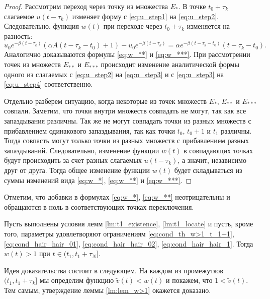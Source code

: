 \begin{proof}
	
	Рассмотрим переход через точку из множества $E_*$. В точке $t_0 + \tau_k$ слагаемое $u(t - \tau_k)$ изменяет форму с \eqref{eq:u_step1} %
	на \eqref{eq:u_step2}. %
	Следовательно, функция $w(t)$ при переходе через $t_0 + \tau_k$ изменяется на разность:
	\[u_0 e^{-\beta( t-\tau_k)}(\alpha A(t - \tau_k - t_0)+1) - u_0e^{-\beta( t - \tau_k)}= \alpha e^{-\beta( t-\tau_k-t_0)}(t-\tau_k-t_0).\]
	Аналогично доказываются формулы \eqref{eq:w_**} и \eqref{eq:w_***}. При рассмотрении точек из множеств $E_{**}$ и $E_{***}$ происходит изменение аналитической формы одного из слагаемых с \eqref{eq:u_step2} на \eqref{eq:u_step3} и с \eqref{eq:u_step3} на \eqref{eq:u_step4} соответственно.
	
	Отдельно разберем ситуацию, когда некоторые из точек множеств $E_*$, $E_{**}$ и $E_{***}$ совпали. Заметим, что точки внутри множеств совпадать не могут, так как все запаздывания различны. Так же не могут совпадать точки из разных множеств с прибавлением одинакового запаздывания, так как точки $t_0$, $t_0 + 1$ и $t_1$ различны. Тогда совпасть могут только точки из разных множеств  с прибавлением разных запаздываний. Следовательно, изменение функции $w(t)$ в совпадающих точках будут происходить за счет разных слагаемых $u(t-\tau_k)$, а значит, независимо друг от друга. Тогда общее изменение функции $w(t)$ будет складываться из суммы изменений вида \eqref{eq:w_*}, \eqref{eq:w_**} и \eqref{eq:w_***}.
\end{proof}


Отметим, что добавки в формулах \eqref{eq:w_*}, \eqref{eq:w_**} неотрицательны и обращаются в ноль в соответствующих точках переключения.

\begin{lemma}
	\label{lm:lem_w>1}
	Пусть выполнены условия лемм \ref{lm:t1_existence}, \ref{lm:t1_locate} и пусть, кроме того,
	параметры удовлетворяют ограничениям \eqref{eq:cond_th_w>1_t_1+1}, \eqref{eq:cond_hair_hair_01}, \eqref{eq:cond_hair_hair_02}, \eqref{eq:cond_hair_hair_1}.
	Тогда $w(t)>1$ при $t\in(t_1,t_1+\tau_N]$.
\end{lemma}

Идея доказательства состоит в следующем. На каждом из промежутков $(t_1, t_1+\tau_k]$ мы определим функцию $\tilde{v}(t) < w(t)$ и покажем, что $1 < \tilde{v}(t)$. Тем самым, утверждение леммы \ref{lm:lem_w>1} окажется доказано.


